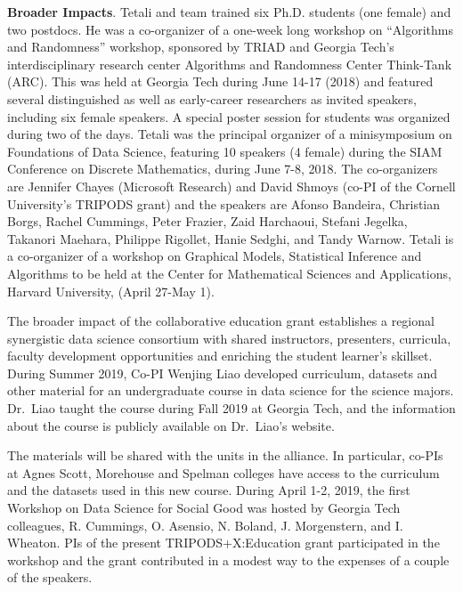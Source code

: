 \documentclass[12pt]{article}
\begin{document}

{\bf Broader Impacts}.
Tetali and team trained six Ph.D. students (one female) and two postdocs.
He was a co-organizer of a one-week long workshop on ``Algorithms and Randomness'' workshop, sponsored by TRIAD and Georgia Tech’s interdisciplinary research center Algorithms and Randomness Center Think-Tank (ARC). 
This was held at Georgia Tech during June 14-17 (2018) and featured several distinguished as well as early-career researchers as invited speakers, including six female speakers. 
A special poster session for students was organized during two of the days. 
Tetali was the principal organizer of a minisymposium on Foundations of Data Science, featuring 10 speakers (4 female) during the SIAM Conference on Discrete Mathematics, during June 7-8, 2018. The co-organizers are Jennifer Chayes (Microsoft Research) and David Shmoys (co-PI of the Cornell University’s TRIPODS grant) and the speakers are Afonso Bandeira, Christian Borgs, Rachel Cummings, Peter Frazier, Zaid Harchaoui, Stefani Jegelka, Takanori Maehara, Philippe Rigollet, Hanie Sedghi, and Tandy Warnow.
Tetali is a co-organizer of a workshop on Graphical Models, Statistical Inference and Algorithms to be held at the Center for Mathematical Sciences and Applications, Harvard University,  (April 27-May 1).


The broader impact of the collaborative education grant establishes a regional synergistic data science consortium with shared instructors, presenters, curricula, faculty development opportunities and enriching the student learner’s skillset. During Summer 2019, Co-PI Wenjing Liao developed curriculum, datasets and other material for an undergraduate course in data science for the science majors. Dr.~Liao taught the course during Fall 2019 at Georgia Tech, and the information about the course is publicly available on Dr.~Liao's website.

The materials will be shared with the units in the alliance. In particular, co-PIs at Agnes Scott, Morehouse and Spelman colleges have access to the curriculum and the datasets used in this new course.  During April 1-2, 2019, the first Workshop on Data Science for Social Good was hosted by Georgia Tech colleagues, R. Cummings, O. Asensio, N. Boland, J. Morgenstern, and I. Wheaton. PIs of the present TRIPODS+X:Education grant participated in the workshop and the grant contributed in a modest way to the expenses of a couple of the speakers. 
\end{document}
